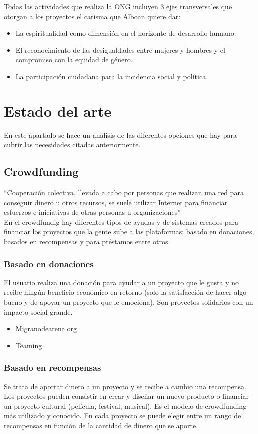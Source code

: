Todas las actividades que realiza la ONG incluyen 3 ejes transversales que otorgan a los proyectos el carisma que Alboan quiere dar:
\begin{itemize}
	\item La espiritualidad como dimensión en el horizonte de desarrollo humano.
	\item El reconocimiento de las desigualdades entre mujeres y hombres y el compromiso con la equidad de género.
	\item La participación ciudadana para la incidencia social y política.
\end{itemize}

\section{Estado del arte}
En este apartado se hace un análisis de las diferentes opciones que hay para cubrir las necesidades citadas anteriormente.
\subsection{Crowdfunding}
“Cooperación colectiva, llevada a cabo por personas que realizan una red para conseguir dinero u otros recursos, se suele utilizar Internet para financiar esfuerzos e iniciativas de otras personas u organizaciones”\cite{crowdw}\\

En el crowdfundig hay diferentes tipos de ayudas y de sistemas creados para financiar los proyectos que la gente sube a las plataformas: basado en donaciones, basados en recompensas y para préstamos entre otros.

\subsubsection{Basado en donaciones}
El usuario realiza una donación para ayudar a un proyecto que le gusta y no recibe ningún beneficio económico en retorno (solo la satisfacción de hacer algo bueno y de apoyar un proyecto que le emociona). Son proyectos solidarios con un impacto social grande.
\begin{itemize}
	\item Migranodearena.org
	\item Teaming
\end{itemize}

\subsubsection{Basado en recompensas}
Se trata de aportar dinero a un proyecto y se recibe a cambio una recompensa. Los proyectos pueden consistir en crear y diseñar un nuevo producto o financiar un proyecto cultural (película, festival, musical). Es el modelo de crowdfunding más utilizado y conocido. En cada proyecto se puede elegir entre un rango de recompensas en función de la cantidad de dinero que se aporte.

